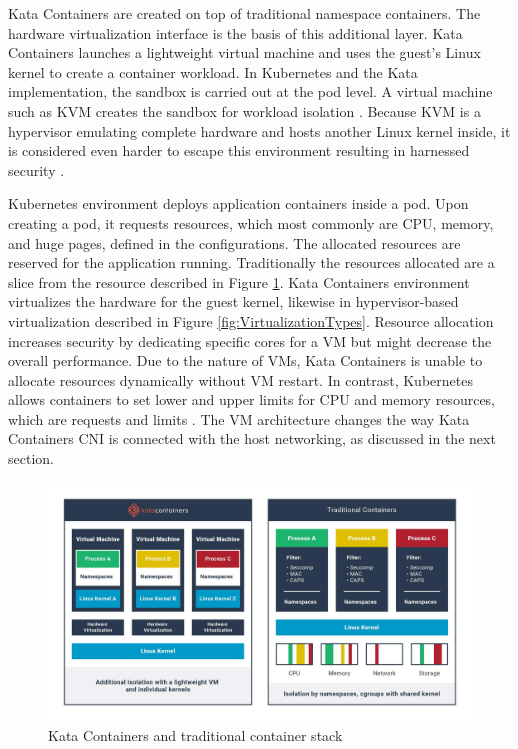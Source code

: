 Kata Containers are created on top of traditional namespace containers. The hardware virtualization interface is the basis of this additional layer. Kata Containers launches a lightweight virtual machine and uses the guest's Linux kernel to create a container workload. In Kubernetes and the Kata implementation, the sandbox is carried out at the pod level. A virtual machine such as KVM creates the sandbox for workload isolation \cite{KataContainersVirtualization}. Because KVM is a hypervisor emulating complete hardware and hosts another Linux kernel inside, it is considered even harder to escape this environment resulting in harnessed security \cite{Eder2016}.

Kubernetes environment deploys application containers inside a pod. Upon creating a pod, it requests resources, which most commonly are CPU, memory, and huge pages, defined in the configurations. The allocated resources are reserved for the application running. Traditionally the resources allocated are a slice from the resource described in Figure \ref{fig:KataContainersStack}. Kata Containers environment virtualizes the hardware for the guest kernel, likewise in hypervisor-based virtualization described in Figure \ref{fig:VirtualizationTypes}. Resource allocation increases security by dedicating specific cores for a VM but might decrease the overall performance. Due to the nature of VMs, Kata Containers is unable to allocate resources dynamically without VM restart. In contrast, Kubernetes allows containers to set lower and upper limits for CPU and memory resources, which are requests and limits \cite{KubernetesContainerResource}. The VM architecture changes the way Kata Containers CNI is connected with the host networking, as discussed in the next section.

\begin{figure}[ht]
  \begin{center}
    \includegraphics[width=13.5cm]{images/KataContainersStack.jpg}
    \caption{Kata Containers and traditional container stack \cite{KataContainers}}
    \label{fig:KataContainersStack}
  \end{center}
\end{figure} 

